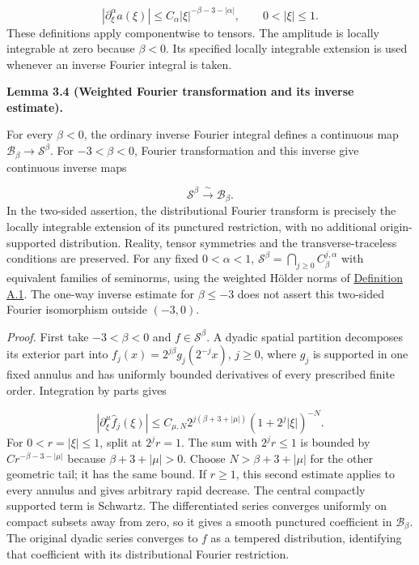 \documentclass[
  english,
  11pt,
  reqno]{amsart}
\makeatletter
\newcommand{\pandocstatementheading}[1]{%
  \par\addpenalty{\@beginparpenalty}%
  \addvspace{.5\baselineskip plus .2\baselineskip minus .2\baselineskip}%
  {\normalfont\bfseries #1\par}%
  \nobreak\@afterindenttrue\@afterheading
}
\makeatother
\begin{document}
\label{eq:online-root-decay-amplitude-test} \[
|\partial_\xi^\alpha a(\xi)|
\le C_\alpha|\xi|^{-\beta-3-|\alpha|},
\qquad 0<|\xi|\le1.
\] These definitions apply componentwise to tensors. The amplitude is
locally integrable at zero because \(\beta<0\). Its specified locally
integrable extension is used whenever an inverse Fourier integral is
taken.

\pandocstatementheading{\leavevmode{}\label{lem:online-decay-fourier-isomorphism}Lemma 3.4 (Weighted Fourier transformation and its inverse estimate).}

For every \(\beta<0\), the ordinary inverse Fourier integral defines a
continuous map \(\mathscr B_\beta\to\mathscr S^\beta\). For
\(-3<\beta<0\), Fourier transformation and this inverse give continuous
inverse maps

\label{eq:online-root-weighted-fourier-isomorphism} \[
\mathscr S^\beta\xrightarrow{\ \sim\ }\mathscr B_\beta.
\] In the two-sided assertion, the distributional Fourier transform is
precisely the locally integrable extension of its punctured restriction,
with no additional origin-supported distribution. Reality, tensor
symmetries and the transverse-traceless conditions are preserved. For
any fixed \(0<\alpha<1\),
\(\mathscr S^\beta=\bigcap_{j\ge0}C^{j,\alpha}_\beta\) with equivalent
families of seminorms, using the weighted Hölder norms of
\hyperref[def:online-weighted-holder-chart-spaces]{Definition A.1}. The
one-way inverse estimate for \(\beta\le-3\) does not assert this
two-sided Fourier isomorphism outside \((-3,0)\).

\emph{Proof.} First take \(-3<\beta<0\) and \(f\in\mathscr S^\beta\). A
dyadic spatial partition decomposes its exterior part into
\(f_j(x)=2^{j\beta}g_j(2^{-j}x)\), \(j\ge0\), where \(g_j\) is supported
in one fixed annulus and has uniformly bounded derivatives of every
prescribed finite order. Integration by parts gives

\label{eq:online-root-forward-annular-estimate} \[
|\partial_\xi^\mu\widehat f_j(\xi)|
\le C_{\mu,N}2^{j(\beta+3+|\mu|)}
(1+2^j|\xi|)^{-N}.
\] For \(0<r=|\xi|\le1\), split at \(2^jr=1\). The sum with \(2^jr\le1\)
is bounded by \(Cr^{-\beta-3-|\mu|}\) because \(\beta+3+|\mu|>0\).
Choose \(N>\beta+3+|\mu|\) for the other geometric tail; it has the same
bound. If \(r\ge1\), this second estimate applies to every annulus and
gives arbitrary rapid decrease. The central compactly supported term is
Schwartz. The differentiated series converges uniformly on compact
subsets away from zero, so it gives a smooth punctured coefficient in
\(\mathscr B_\beta\). The original dyadic series converges to \(f\) as a
tempered distribution, identifying that coefficient with its
distributional Fourier restriction.
\end{document}
